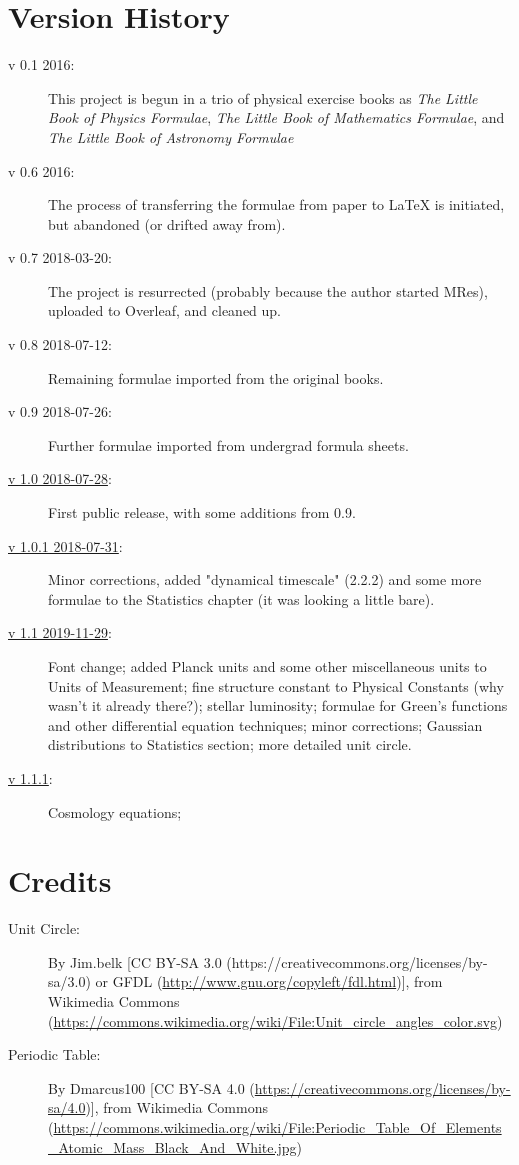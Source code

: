 \section{Version History}
\begin{description}
\item[v 0.1 2016:] This project is begun in a trio of physical exercise books as \textit{The Little Book of Physics Formulae}, \textit{The Little Book of Mathematics Formulae}, and \textit{The Little Book of Astronomy Formulae}
\item[v 0.6 2016:] The process of transferring the formulae from paper to LaTeX is initiated, but abandoned (or drifted away from).
\item[v 0.7 2018-03-20:] The project is resurrected (probably because the author started MRes), uploaded to Overleaf, and cleaned up.
\item[v 0.8 2018-07-12:] Remaining formulae imported from the original books.
\item[v 0.9 2018-07-26:] Further formulae imported from undergrad formula sheets.
\item[\href{http://www.webofworlds.net/s/ultimate-astrophysics-cheat-sheet_1-0.pdf}{v 1.0 2018-07-28}:] First public release, with some additions from 0.9.
\item[\href{http://www.webofworlds.net/s/ultimate-astrophysics-cheat-sheet_1-0-1.pdf}{v 1.0.1 2018-07-31}:] Minor corrections, added "dynamical timescale" (2.2.2) and some more formulae to the Statistics chapter (it was looking a little bare).
\item[\href{http://www.webofworlds.net/s/ultimate-astrophysics-cheat-sheet_1-1.pdf}{v 1.1 2019-11-29}:] Font change; added Planck units and some other miscellaneous units to Units of Measurement; fine structure constant to Physical Constants (why wasn't it already there?); stellar luminosity; formulae for Green's functions and other differential equation techniques; minor corrections; Gaussian distributions to Statistics section; more detailed unit circle.
\item[\href{http://www.webofworlds.net/s/ultimate-astrophysics-cheat-sheet_1-2.pdf}{v 1.1.1}:] Cosmology equations;  

\end{description}

\section{Credits}

\begin{description}
\item [Unit Circle:] By Jim.belk [CC BY-SA 3.0 (https://creativecommons.org/licenses/by-sa/3.0) or GFDL (\url{http://www.gnu.org/copyleft/fdl.html})], from Wikimedia Commons (\url{https://commons.wikimedia.org/wiki/File:Unit_circle_angles_color.svg})
\item [Periodic Table:] By Dmarcus100 [CC BY-SA 4.0 (\url{https://creativecommons.org/licenses/by-sa/4.0})], from Wikimedia Commons (\url{https://commons.wikimedia.org/wiki/File:Periodic_Table_Of_Elements_Atomic_Mass_Black_And_White.jpg})
\end{description}


